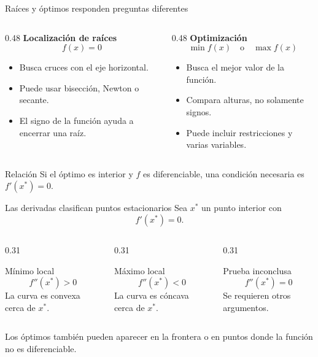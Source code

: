 \documentclass[../../main.tex]{subfiles}
\begin{document}
\begin{frame}{Raíces y óptimos responden preguntas diferentes}
\begin{columns}[T]
\begin{column}{0.48\textwidth}
\textbf{Localización de raíces}
\[
f(x)=0
\]
\begin{itemize}
  \item Busca cruces con el eje horizontal.
  \item Puede usar bisección, Newton o secante.
  \item El signo de la función ayuda a encerrar una raíz.
\end{itemize}
\end{column}

\begin{column}{0.48\textwidth}
\textbf{Optimización}
\[
\min f(x)
\quad \text{o} \quad
\max f(x)
\]
\begin{itemize}
  \item Busca el mejor valor de la función.
  \item Compara alturas, no solamente signos.
  \item Puede incluir restricciones y varias variables.
\end{itemize}
\end{column}
\end{columns}

\begin{alertblock}{Relación}
Si el óptimo es interior y $f$ es diferenciable, una condición necesaria es $f'(x^*)=0$.
\end{alertblock}
\end{frame}

\begin{frame}{Las derivadas clasifican puntos estacionarios}
Sea $x^*$ un punto interior con
\[
f'(x^*)=0.
\]

\begin{columns}[T]
\begin{column}{0.31\textwidth}
\begin{block}{Mínimo local}
\[
f''(x^*)>0
\]
La curva es convexa cerca de $x^*$.
\end{block}
\end{column}

\begin{column}{0.31\textwidth}
\begin{block}{Máximo local}
\[
f''(x^*)<0
\]
La curva es cóncava cerca de $x^*$.
\end{block}
\end{column}

\begin{column}{0.31\textwidth}
\begin{block}{Prueba inconclusa}
\[
f''(x^*)=0
\]
Se requieren otros argumentos.
\end{block}
\end{column}
\end{columns}

\medskip
Los óptimos también pueden aparecer en la frontera o en puntos donde la función no es diferenciable.
\end{frame}
\end{document}
